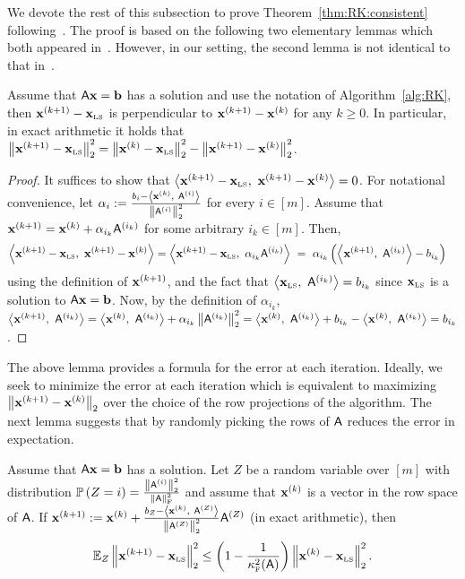 %
%
%
We devote the rest of this subsection to prove Theorem~\ref{thm:RK:consistent} following~\cite{RK}. The proof is based on the following two elementary lemmas which both appeared in~\cite{RK}. However, in our setting, the second lemma is not identical to that in~\cite{RK}.
\begin{lemma}[Orthogonality]\label{lem:ortho}
Assume that ${\mathsf{A} }\mathbf{x}= {\mathbf b}$ has a solution and use the notation of Algorithm~\ref{alg:RK}, then $\mathbf{x}^{(k+1)} -\mathbf{x}_{\textrm{\tiny LS}}$ is perpendicular to $\mathbf{x}^{(k+1)} - \mathbf{x}^{(k)}$ for any $k\geq 0$. In particular, in exact arithmetic it holds that $\left\|\mathbf{x}^{(k+1)} - \mathbf{x}_{\textrm{\tiny LS}}\right\|_2^2 = \left\|\mathbf{x}^{(k)} - \mathbf{x}_{\textrm{\tiny LS}}\right\|_2^2 - \left\|\mathbf{x}^{(k+1)} - \mathbf{x}^{(k)}\right\|_2^2$.
\end{lemma}
%
%
\begin{proof}
It suffices to show that $\left\langle {\mathbf{x}^{(k+1)} - \mathbf{x}_{\textrm{\tiny LS}}},\ {\mathbf{x}^{(k+1)} - \mathbf{x}^{(k)}} \right\rangle = 0$. For notational convenience, let $\alpha_i := \frac{b_i - \left\langle {\mathbf{x}^{(k)}},\ {{\mathsf{A} }^{(i)}} \right\rangle}{\left\|{\mathsf{A} }^{(i)}\right\|_2^2}$ for every $i\in{[m]}$. Assume that $\mathbf{x}^{(k+1)} = \mathbf{x}^{(k)} + \alpha_{i_k} {\mathsf{A} }^{(i_k)}$ for some arbitrary $i_k\in [m]$. Then,
\begin{align*}
	\ip{\x^{(k+1)} - \xls}{\x^{(k+1)} - \x^{(k)} }  & =   \ip{\x^{(k+1)} - \xls}{ \alpha_{i_k} \ar{i_k}} \ = \ \alpha_{i_k}\left(\ip{\x^{(k+1)} }{ \ar{i_k}} -  b_{i_k}\right)
\end{align*}
using the definition of $\mathbf{x}^{(k+1)}$, and the fact that $\left\langle {\mathbf{x}_{\textrm{\tiny LS}}},\ {{\mathsf{A} }^{(i_k)}} \right\rangle = b_{i_k}$ since $\mathbf{x}_{\textrm{\tiny LS}}$ is a solution to ${\mathsf{A} }\mathbf{x}={\mathbf b}$. Now, by the definition of $\alpha_{i_k} $, $\left\langle {\mathbf{x}^{(k+1)}},\ {{\mathsf{A} }^{(i_k)}} \right\rangle = \left\langle {\mathbf{x}^{(k)}},\ {{\mathsf{A} }^{(i_k)}} \right\rangle + \alpha_{i_k} \left\|{\mathsf{A} }^{(i_k)}\right\|_2^2 = \left\langle {\mathbf{x}^{(k)}},\ {{\mathsf{A} }^{(i_k)}} \right\rangle + b_{i_k} - \left\langle {\mathbf{x}^{(k)}},\ {{\mathsf{A} }^{(i_k)}} \right\rangle = b_{i_k}$.
\end{proof}
%
%
The above lemma provides a formula for the error at each iteration. Ideally, we seek to minimize the error at each iteration which is equivalent to maximizing $\left\|\mathbf{x}^{(k+1)} - \mathbf{x}^{(k)}\right\|_2$ over the choice of the row projections of the algorithm. The next lemma suggests that by randomly picking the rows of ${\mathsf{A} }$ reduces the error in expectation.
\begin{lemma}\label{lem:avg}
Assume that ${\mathsf{A} }\mathbf{x}={\mathbf b}$ has a solution. Let $Z$ be a random variable over $[m]$ with distribution $\mathbb{P}\left(Z=i\right) = \frac{\left\|{\mathsf{A} }^{(i)}\right\|_2^2}{\left\|{\mathsf{A} }\right\|_{\textrm{F}}^2}$ and assume that $\mathbf{x}^{(k)}$ is a vector in the row space of ${\mathsf{A} }$. If $\mathbf{x}^{(k+1)} := \mathbf{x}^{(k)} + \frac{b_Z - \left\langle {\mathbf{x}^{(k)}},\ {{\mathsf{A} }^{(Z)}} \right\rangle}{\left\|{\mathsf{A} }^{(Z)}\right\|_2^2} {\mathsf{A} }^{(Z)}$ (in exact arithmetic), then
\begin{equation}
\operatorname{\mathbb{E}}_{Z}\left\|\mathbf{x}^{(k+1)} - \mathbf{x}_{\textrm{\tiny LS}}\right\|_2^2 \leq \left(1 - \frac1{\kappa^2_{\textrm{\tiny F}}({\mathsf{A} })}\right) \left\|\mathbf{x}^{(k)} - \mathbf{x}_{\textrm{\tiny LS}}\right\|_2^2.
\end{equation}
\end{lemma}
